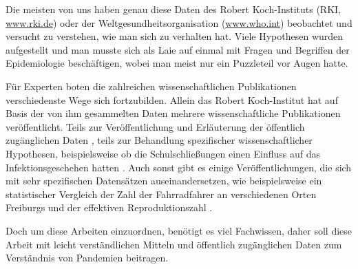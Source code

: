 Die meisten von uns haben genau diese Daten des Robert Koch-Instituts (RKI, \href{www.rki.de}{www.rki.de}) oder der Weltgesundheitsorganisation (\href{www.who.int}{www.who.int}) beobachtet und versucht zu verstehen, wie man sich zu verhalten hat. Viele Hypothesen wurden aufgestellt und man musste sich als Laie auf einmal mit Fragen und Begriffen der Epidemiologie beschäftigen, wobei man meist nur ein Puzzleteil vor Augen hatte.

Für Experten boten die zahlreichen wissenschaftlichen Publikationen verschiedenste Wege sich fortzubilden. Allein das Robert Koch-Institut hat auf Basis der von ihm gesammelten Daten mehrere wissenschaftliche Publikationen veröffentlicht. Teils zur Veröffentlichung und Erläuterung der öffentlich zugänglichen Daten \autocite{RKI_Bulletin}, teils zur Behandlung spezifischer wissenschaftlicher Hypothesen, beispielsweise ob die Schulschließungen einen Einfluss auf das Infektionsgeschehen hatten \autocite{OtteimKampe2020Surveillance}. Auch sonst gibt es einige Veröffentlichungen, die sich mit sehr spezifischen Datensätzen auseinandersetzen, wie beispielsweise ein statistischer Vergleich der Zahl der Fahrradfahrer an verschiedenen Orten Freiburgs und der effektiven Reproduktionszahl \autocite{Fabian}.


Doch um diese Arbeiten einzuordnen, benötigt es viel Fachwissen, daher soll diese Arbeit mit leicht verständlichen Mitteln und öffentlich zugänglichen Daten zum Verständnis von Pandemien beitragen.